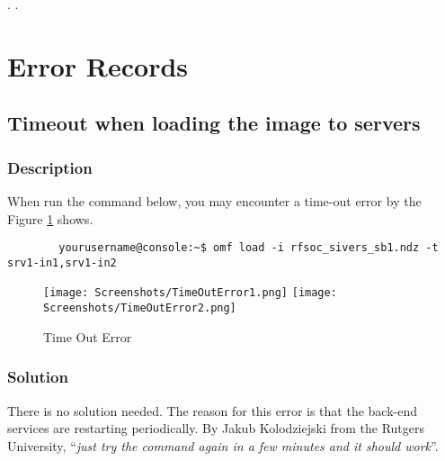 \documentclass{article}
\begin{document}
    
    
    
    
    
    
    
    
    
    
    
    
    
    
    
    
    
    
    
    
    
    
    
    
    
    
    
    
\newpage
.
\newpage
.
\newpage

\section{Error Records}
\subsection{Timeout when loading the image to servers}  \label{sec: timeout error}
    \subsubsection{Description}
    When run the command below, you may encounter a time-out error by the Figure \ref{fig: time out error} shows. 
    \begin{verbatim}
        yourusername@console:~$ omf load -i rfsoc_sivers_sb1.ndz -t srv1-in1,srv1-in2
    \end{verbatim}
    
    \begin{figure}
    	\captionsetup[subfigure]{position=bottom}
    	\centering
    	
         {\texttt{[image: Screenshots/TimeOutError1.png]}}
        \hspace{.1\linewidth}
         {\texttt{[image: Screenshots/TimeOutError2.png]}}
        
        \caption{Time Out Error}    \label{fig: time out error}
    \end{figure}

    \subsubsection{Solution}
        There is no solution needed. The reason for this error is that the back-end services are restarting periodically. By Jakub  Kolodziejski from the Rutgers University, ``\emph{just try the command again in a few minutes and it should work}''. 
        
\end{document}
